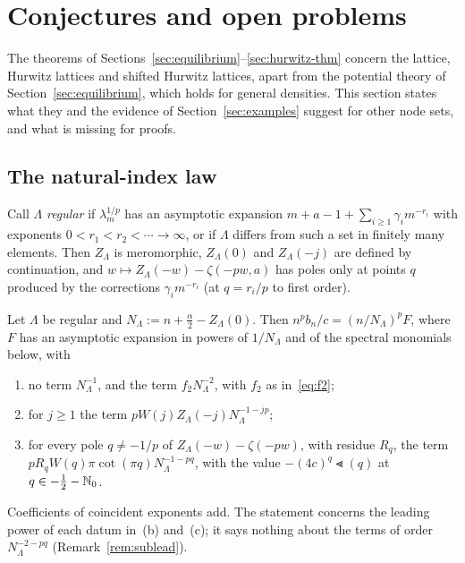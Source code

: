 \section{Conjectures and open problems}\label{sec:conj}

The theorems of Sections~\ref{sec:equilibrium}--\ref{sec:hurwitz-thm} concern the lattice, Hurwitz lattices and shifted
Hurwitz lattices, apart from the potential theory of Section~\ref{sec:equilibrium}, which holds for general densities. This section
states what they and the evidence of Section~\ref{sec:examples} suggest for other node sets, and what is missing for proofs.

\subsection{The natural-index law}\label{sec:conj-law}
Call $\Lambda$ \emph{regular} if $\lambda_m^{1/p}$ has an asymptotic expansion $m+a-1+\sum_{i\ge1}\gamma_im^{-r_i}$ with
exponents $0<r_1<r_2<\dotsb\to\infty$, or if $\Lambda$ differs from such a set in finitely many elements. Then $Z_\Lambda$ is
meromorphic, $Z_\Lambda(0)$ and $Z_\Lambda(-j)$ are defined by continuation, and $w\mapsto Z_\Lambda(-w)-\zeta(-pw,a)$ has
poles only at points $q$ produced by the corrections $\gamma_im^{-r_i}$ (at $q=r_i/p$ to first order).

\begin{conjecture}\label{conj:natural}
Let $\Lambda$ be regular and $N_\Lambda:=n+\frac\alpha2-Z_\Lambda(0)$. Then $n^pb_n/c=(n/N_\Lambda)^pF$, where $F$ has an
asymptotic expansion in powers of $1/N_\Lambda$ and of the spectral monomials below, with
\begin{enumerate}
\item[(a)] no term $N_\Lambda^{-1}$, and the term $f_2N_\Lambda^{-2}$, with $f_2$ as in~\eqref{eq:f2};
\item[(b)] for $j\ge1$ the term $pW(j)Z_\Lambda(-j)N_\Lambda^{-1-jp}$;
\item[(c)] for every pole $q\ne-1/p$ of $Z_\Lambda(-w)-\zeta(-pw)$, with residue $R_q$, the term
$pR_qW(q)\pi\cot(\pi q)N_\Lambda^{-1-pq}$, with the value $-(4c)^q\Lt(q)$ at $q\in-\frac12-\mathbb{N}_0$.
\end{enumerate}
Coefficients of coincident exponents add. The statement concerns the leading power of each datum in~(b) and~(c); it
says nothing about the terms of order $N_\Lambda^{-2-pq}$ (Remark~\ref{rem:sublead}).
\end{conjecture}

